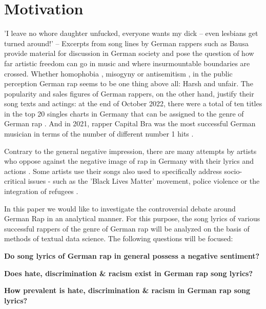 \section{Motivation}
'I leave no whore daughter unfucked, everyone wants my dick -- even lesbians get turned around!' -- Excerpts from song lines by German rappers such as Bausa \cite{steffes-lay_2019} provide material for discussion in German society and pose the question of how far artistic freedom can go in music and where insurmountable boundaries are crossed. Whether homophobia \cite{steffes-lay_2019}, misogyny \cite{steffes-lay_2019} or antisemitism \cite{salomo_greven_2021}, in the public perception German rap seems to be one thing above all: Harsh and unfair. The popularity and sales figures of German rappers, on the other hand, justify their song texts and actings: at the end of October 2022, there were a total of ten titles in the top 20 singles charts in Germany that can be assigned to the genre of German rap \cite{mtv_germany_2022}. And in 2021, rapper Capital Bra was the most successful German musician in terms of the number of different number 1 hits \cite{br_2019}. 

Contrary to the general negative impression, there are many attempts by artists who oppose against the negative image of rap in Germany with their lyrics and actions \cite{Deutschlandfunk_2021}. Some artists use their songs also used to specifically address socio-critical issues - such as the 'Black Lives Matter' movement, police violence or the integration of refugees \cite{me-redaktion_2021}.

In this paper we would like to investigate the controversial debate around German Rap in an analytical manner. For this purpose, the song lyrics of various successful rappers of the genre of German rap will be analyzed on the basis of methods of textual data science. The following questions will be focused:

\begin{questions}
    \item \textbf{Do song lyrics of German rap in general possess a negative sentiment?}
    \item \textbf{Does hate, discrimination \& racism exist in German rap song lyrics?}
    \item \textbf{How prevalent is hate, discrimination \& racism in German rap song lyrics?}
\end{questions}











